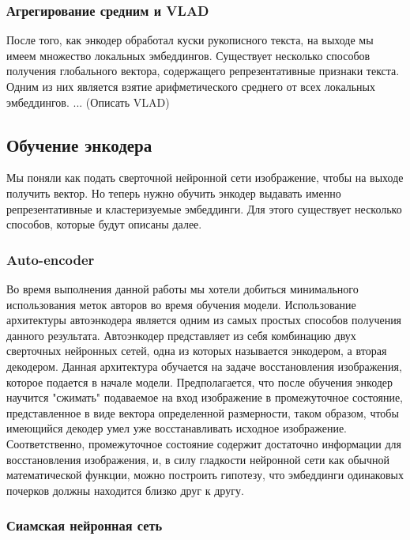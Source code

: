 \subsubsection{Агрегирование средним и VLAD}

    После того, как энкодер обработал куски рукописного текста, на выходе мы имеем множество локальных эмбеддингов. Существует несколько способов получения глобального вектора, содержащего репрезентативные признаки текста. Одним из них является взятие арифметического среднего от всех локальных эмбеддингов. ... (Описать VLAD)

\subsection{Обучение энкодера}

    Мы поняли как подать сверточной нейронной сети изображение, чтобы на выходе получить вектор. Но теперь нужно обучить энкодер выдавать именно репрезентативные и кластеризуемые эмбеддинги. Для этого существует несколько способов, которые будут описаны далее.

\subsubsection{Auto-encoder}

Во время выполнения данной работы мы хотели добиться минимального использования меток авторов во время обучения модели. Использование архитектуры автоэнкодера является одним из самых простых способов получения данного результата. Автоэнкодер представляет из себя комбинацию двух сверточных нейронных сетей, одна из которых называется энкодером, а вторая декодером. Данная архитектура обучается на задаче восстановления изображения, которое подается в начале модели. Предполагается, что после обучения энкодер научится "сжимать" подаваемое на вход изображение в промежуточное состояние, представленное в виде вектора определенной размерности, таком образом, чтобы имеющийся декодер умел уже восстанавливать исходное изображение. Соответственно, промежуточное состояние содержит достаточно информации для восстановления изображения, и, в силу гладкости нейронной сети как обычной математической функции, можно построить гипотезу, что эмбеддинги одинаковых почерков должны находится близко друг к другу. 

\subsubsection{Сиамская нейронная сеть}

